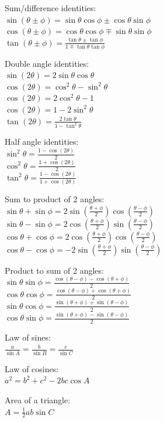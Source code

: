 \documentclass[10pt,landscape,a4paper]{article}
\begin{document}
\begin{multicols*}{5}
  Sum/difference identities: \\
  \(\sin (\theta \pm \phi) = \sin \theta \cos \phi \pm \cos \theta \sin \phi\) \\
  \(\cos (\theta \pm \phi) = \cos \theta \cos \phi \mp \sin \theta \sin \phi\) \\
  \(\tan (\theta \pm \phi) = \frac{\tan \theta \pm \tan \phi}{1 \mp \tan \theta \tan \phi}\)

  Double angle identities: \\
  \(\sin (2 \theta) = 2 \sin \theta \cos \theta\) \\
  \(\cos (2 \theta) = \cos^2 \theta - \sin^2 \theta\) \\
  \(\cos (2 \theta) = 2 \cos^2 \theta - 1\) \\
  \(\cos (2 \theta) = 1 - 2 \sin^2 \theta\) \\
  \(\tan (2 \theta) = \frac{2 \tan \theta}{1 - \tan^2 \theta}\)

  Half angle identities: \\
  \(\sin^2 \theta = \frac{1 - \cos (2 \theta)}{2}\) \\
  \(\cos^2 \theta = \frac{1 + \cos (2 \theta)}{2}\) \\
  \(\tan^2 \theta = \frac{1 - \cos (2 \theta)}{1 + \cos (2 \theta)}\)

  Sum to product of 2 angles: \\
  \(\sin \theta + \sin \phi = 2 \sin \left( \frac{\theta + \phi}{2} \right) \cos \left( \frac{\theta - \phi}{2} \right)\) \\
  \(\sin \theta - \sin \phi = 2 \cos \left( \frac{\theta + \phi}{2} \right) \sin \left( \frac{\theta - \phi}{2} \right)\) \\
  \(\cos \theta + \cos \phi = 2 \cos \left( \frac{\theta + \phi}{2} \right) \cos \left( \frac{\theta - \phi}{2} \right)\) \\
  \(\cos \theta - \cos \phi = - 2 \sin \left( \frac{\theta + \phi}{2} \right) \sin \left( \frac{\theta - \phi}{2} \right)\)

  Product to sum of 2 angles: \\
  \(\sin \theta \sin \phi = \frac{\cos (\theta - \phi) - \cos (\theta + \phi)}{2}\) \\
  \(\cos \theta \cos \phi = \frac{\cos (\theta - \phi) + \cos (\theta + \phi)}{2}\) \\
  \(\sin \theta \cos \phi = \frac{\sin (\theta + \phi) + \sin (\theta - \phi)}{2}\) \\
  \(\cos \theta \sin \phi = \frac{\sin (\theta + \phi) - \sin (\theta - \phi)}{2}\)

  Law of sines: \\
  \(\frac{a}{\sin A} = \frac{b}{\sin B} = \frac{c}{\sin C}\)

  Law of cosines: \\
  \(a^2 = b^2 + c^2 - 2bc \cos A\)

  Area of a triangle: \\
  \(A = \frac{1}{2} ab \sin C\)

\end{multicols*}
\end{document}
